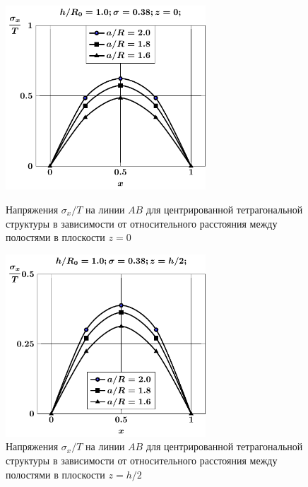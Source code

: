 \begin{figure}[h!]
\centering\footnotesize
\parbox[b]{7.5cm}{\centering\includegraphics[width=7.5cm]{cav5-a-h10-r10-z0-sig_x.pdf}
\caption{Напряжения $\sigma_x/T$ на линии $AB$ для центрированной тетрагональной структуры в зависимости от относительного расстояния между полостями в плоскости $z=0$ 
\label{f:7:95}}}\hfil\hfil
\parbox[b]{7.5cm}{\centering\includegraphics[width=7.5cm]{cav5-a-h10-r10-z1-sig_x.pdf}
\caption{Напряжения $\sigma_x/T$ на линии $AB$ для центрированной тетрагональной структуры в зависимости от относительного расстояния между полостями в плоскости $z=h/2$
\label{f:7:96}}}
\end{figure}

